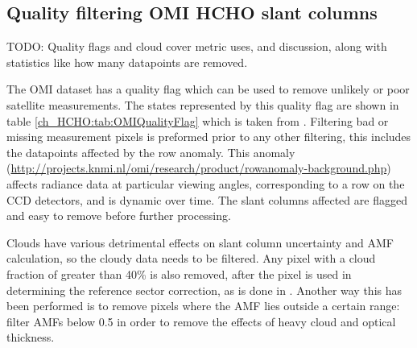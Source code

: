   \subsection{Quality filtering OMI HCHO slant columns}
    \label{ch_HCHO:sec:OMIFiltering}
    TODO: Quality flags and cloud cover metric uses, and discussion, along with statistics like how many datapoints are removed.
    
    The OMI dataset has a quality flag which can be used to remove unlikely or poor satellite measurements.
    The states represented by this quality flag are shown in table \ref{ch_HCHO:tab:OMIQualityFlag} which is taken from \citet{Kurosu2014}.
    Filtering bad or missing measurement pixels is preformed prior to any other filtering, this includes the datapoints affected by the row anomaly.
    This anomaly (\url{http://projects.knmi.nl/omi/research/product/rowanomaly-background.php}) affects radiance data at particular viewing angles, corresponding to a row on the CCD detectors, and is dynamic over time.
    The slant columns affected are flagged and easy to remove before further processing.
    
    Clouds have various detrimental effects on slant column uncertainty and AMF calculation, so the cloudy data needs to be filtered.
    Any pixel with a cloud fraction of greater than 40\% is also removed, after the pixel is used in determining the reference sector correction, as is done in \citet{Abad2015, DeSmedt2015}.
    Another way this has been performed is to remove pixels where the AMF lies outside a certain range: \citet{Martin2002} filter AMFs below 0.5 in order to remove the effects of heavy cloud and optical thickness.
     
